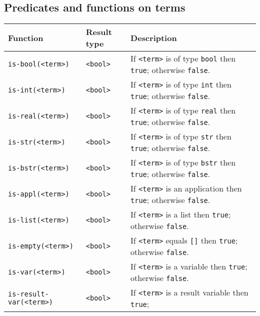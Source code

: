 \documentclass[a4,twoside,noweb]{article} %
\begin{document}
\subsection{Predicates and functions on terms}
\begin{tabular}{|l|l|p{8cm}|} \hline
 Function                               & Result type   & Description \\ \hline
 {\tt is-bool(<term>)}                  & {\tt  <bool>} & If {\tt <term>} is of type {\tt bool} then {\tt true};
                                                          otherwise {\tt false}.\\
 {\tt is-int(<term>)}                   & {\tt  <bool>} & If {\tt <term>} is of type {\tt int} then {\tt true};
                                                          otherwise {\tt false}.\\
 {\tt is-real(<term>)}                  & {\tt  <bool>} & If {\tt <term>} is of type {\tt real} then {\tt true};
                                                          otherwise {\tt false}.\\
 {\tt is-str(<term>)}                   & {\tt  <bool>} & If {\tt <term>} is of type {\tt str} then {\tt true};
                                                          otherwise {\tt false}.\\
 {\tt is-bstr(<term>)}                  & {\tt  <bool>} & If {\tt <term>} is of type {\tt bstr} then {\tt true};
                                                          otherwise {\tt false}.\\
 {\tt is-appl(<term>)}                  & {\tt  <bool>} & If {\tt <term>} is an application then {\tt true};
                                                          otherwise {\tt false}.\\
 {\tt is-list(<term>)}                  & {\tt  <bool>} & If {\tt <term>} is a list then {\tt true};
                                                          otherwise {\tt false}.\\
 {\tt is-empty(<term>)}                 & {\tt  <bool>} & If {\tt <term>} equals {\tt []} then {\tt true};
                                                          otherwise {\tt false}.\\
 {\tt is-var(<term>)}                   & {\tt  <bool>} & If {\tt <term>} is a variable then {\tt true};
                                                          otherwise {\tt false}.\\
 {\tt is-result-var(<term>)}            & {\tt  <bool>} & If {\tt <term>} is a result variable then {\tt true};

\end{tabular}
\end{document}
